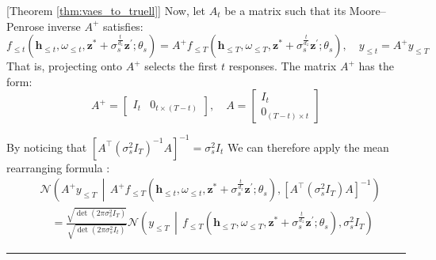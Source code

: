 \documentclass[10pt]{article} %
\newcommand{\BlackBox}{\rule{1.5ex}{1.5ex}}  %
\renewenvironment{proof}{\par\noindent{\bf Proof\ }}{\hfill\BlackBox\\[2mm]}
\newenvironment{proof}{\par\noindent{\bf Proof\ }}{\hfill\BlackBox\\[2mm]}
\begin{document}
\begin{proof}[Theorem \ref{thm:vaes_to_truell}]
Now, let \(A_t\) be a matrix such that its Moore–Penrose inverse \(A^+\) satisfies:
\[
f_{\leq t}(\mathbf{h}_{\leq t}, \omega_{\leq t}, \mathbf{z}^*+ \sigma_{s}^{\frac{t}{d_z}} \mathbf{z}^{\prime}; \theta_{s}) = A^+ f_{\leq T}(\mathbf{h}_{\leq T}, \omega_{\leq T}, \mathbf{z}^*+ \sigma_{s}^{\frac{t}{d_z}} \mathbf{z}^{\prime}; \theta_{s}),
\quad y_{\leq t} = A^+ y_{\leq T}
\]
That is, projecting onto \(A^+\) selects the first \(t\) responses. The matrix \(A^+\) has the form:
\[
A^+ =
\begin{bmatrix}
I_t & 0_{t \times (T - t)}
\end{bmatrix}, \quad
A =
\begin{bmatrix}
I_t \\
0_{(T - t) \times t}
\end{bmatrix}
\]

By noticing that \([A^{\intercal}(\sigma_s^2I_T)^{-1}A]^{-1} = \sigma_s^2I_t\) We can therefore apply the mean rearranging formula \citep{Petersen2008MatCookbook}: 
\begin{align*}
&\mathcal{N}\left(
    A^+y_{\leq T} \,\middle|\, 
    A^+f_{\leq T}(\mathbf{h}_{\leq t}, \omega_{\leq t}, \mathbf{z}^* + \sigma_{s}^{\frac{t}{d_z}} \mathbf{z}^{\prime}; \theta_{s}), 
    \left[A^{\intercal}(\sigma_s^2 I_T) A\right]^{-1}
\right) \\
&\quad = 
\frac{
    \sqrt{\det(2\pi \sigma_s^2 I_T)}
}{
    \sqrt{\det(2\pi \sigma_s^2 I_t)}
}
\mathcal{N}\left(
    y_{\leq T} \,\middle|\, 
    f_{\leq T}(\mathbf{h}_{\leq T}, \omega_{\leq T}, \mathbf{z}^* + \sigma_{s}^{\frac{t}{d_z}} \mathbf{z}^{\prime}; \theta_{s}), 
    \sigma_s^2 I_T
\right)
\end{align*}



\end{proof}
\end{document}
